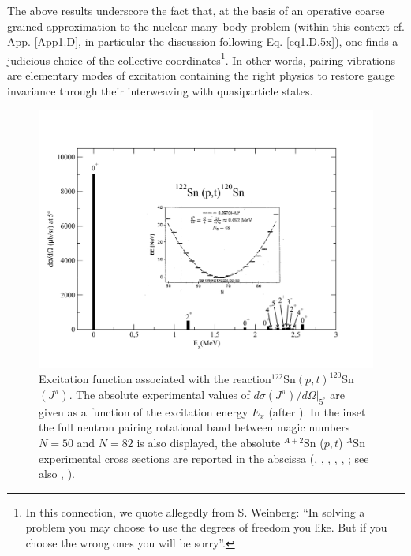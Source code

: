 The above results underscore the fact that, at the basis of an operative coarse grained approximation to the nuclear many--body problem (within this context cf. App. \ref{App1.D}, in particular the discussion following Eq. \ref{eq1.D.5x}), one finds a judicious choice of the collective coordinates\footnote{In this connection, we quote allegedly from S. Weinberg: ``In solving a problem you may choose to use the degrees of freedom you like. But if you choose the wrong ones you will be sorry''.}. In other words, pairing vibrations are elementary modes of excitation containing the right physics to restore gauge invariance through their interweaving with  quasiparticle states.
  \begin{figure}
  \centerline{\includegraphics*[width=\textwidth,angle=0]{nutshell/figs/ExcitedSn122pt.pdf}}
  \caption{Excitation function associated with the reaction$^{122}$Sn$(p,t)^{120}$Sn$(J^\pi)$. The absolute experimental values of $d\sigma(J^\pi)/d\Omega|_{5^\circ}$ are given as a function of the excitation energy $E_x$ (after \cite{Guazzoni:11}). In the inset the full neutron pairing rotational band between magic numbers $N=50$ and $N=82$ is also displayed, the absolute $^{A+2}$Sn ($p,t$) $^{A}$Sn experimental cross sections are reported in the abscissa (\cite{Guazzoni:99}, \cite{Guazzoni:04}, \cite{Guazzoni:06}, \cite{Guazzoni:08}, \cite{Guazzoni:11}, \cite{Guazzoni:12}; see also \cite{Potel:11}, \cite{Potel:13b}).}\label{fig1.3}
  \end{figure}
